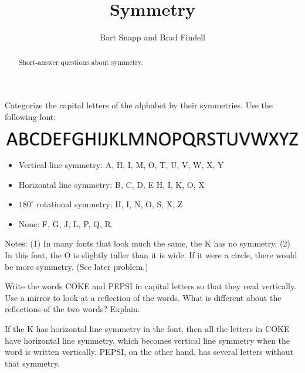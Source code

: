 \documentclass[nooutcomes]{ximera}
\title{Symmetry}
\author{Bart Snapp and Brad Findell}
\begin{document}
\begin{abstract}
Short-answer questions about symmetry. 
\end{abstract}
\maketitle

\begin{question}
Categorize the capital letters of the alphabet by their symmetries.  Use the following font: 
\begin{image}
\includegraphics{alphabet.png}
\end{image}
\begin{freeResponse}
\begin{hint}
\begin{itemize}
\item Vertical line symmetry:  A, H, I, M, O, T, U, V, W, X, Y
\item Horizontal line symmetry:  B, C, D, E H, I, K, O, X  
\item $180^\circ$ rotational symmetry: H, I, N, O, S, X, Z
\item None: F, G, J, L, P, Q, R.  
\end{itemize}
Notes:  (1) In many fonts that look much the same, the K has no symmetry.  (2) In this font, the O is slightly taller than it is wide.  If it were a circle, there would be more symmetry.  (See later problem.)
\end{hint}
\end{freeResponse}
\end{question}

\begin{question}
Write the words COKE and PEPSI in capital letters so that they read vertically.  Use a mirror to look at a reflection of the words.  What is different about the reflections of the two words?  Explain.  
\begin{freeResponse}
\begin{hint}
If the K has horizontal line symmetry in the font, then all the letters in COKE have horizontal line symmetry, which becomes vertical line symmetry when the word is written vertically. PEPSI, on the other hand, has several letters without that symmetry.  
\end{hint}
\end{freeResponse}
\end{question}
\end{document}
